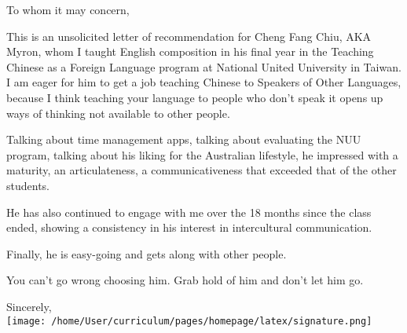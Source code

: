 \documentclass[11pt, a4paper]{letter} %
\begin{document}

\begin{letter}{
}


\opening{To whom it may concern,}

This is an unsolicited letter of recommendation for Cheng Fang Chiu, AKA
Myron, whom I taught English composition in his final year in the
Teaching Chinese as a Foreign Language program at National United
University in Taiwan. I am eager for him to get a job teaching
Chinese to Speakers of Other Languages, because I think teaching 
your language to people who don't speak it opens up ways of thinking
not available to other people.

Talking about time management apps, talking about evaluating the
NUU program, talking about his liking for the Australian lifestyle,
he impressed with a maturity, an articulateness, a communicativeness
that exceeded that of the other students.

He has also continued to engage with me over the 18 months since the class 
ended, showing a consistency in his interest in intercultural communication.

Finally, he is easy-going and gets along with other people.

You can't go wrong choosing him. Grab hold of him and don't let
him go.

\closing{Sincerely,\\
\texttt{[image: /home/User/curriculum/pages/homepage/latex/signature.png]} }



\end{letter}
\end{document}
